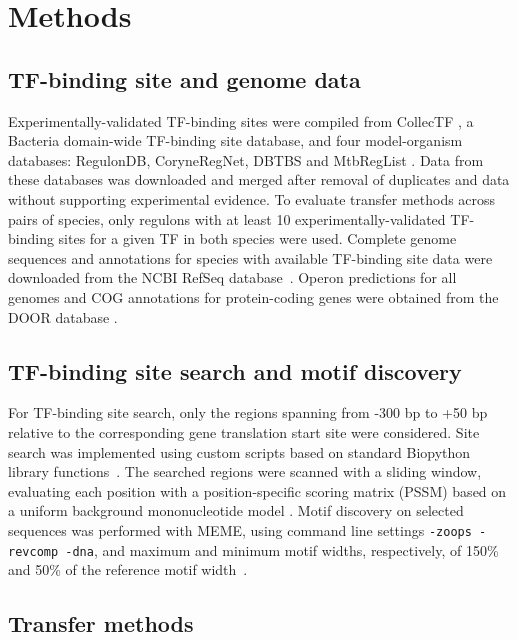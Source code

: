 \section{Methods}

\subsection{TF-binding site and genome data}

Experimentally-validated TF-binding sites were compiled from CollecTF
\citep{kilic2013collectf}, a Bacteria domain-wide TF-binding site database, and
four model-organism databases: RegulonDB, CoryneRegNet, DBTBS and MtbRegList
\citep{jacques2005mtbreglist, sierro2008dbtbs, pauling2012coryneregnet,
  salgado2013regulondb}. Data from these databases was downloaded and merged
after removal of duplicates and data without supporting experimental
evidence. To evaluate transfer methods across pairs of species, only regulons
with at least 10 experimentally-validated TF-binding sites for a given TF in
both species were used. Complete genome sequences and annotations for species
with available TF-binding site data were downloaded from the NCBI RefSeq
database~\citep{pruitt2007ncbi}. Operon predictions for all genomes and COG
annotations for protein-coding genes were obtained from the DOOR database
\citep{tatusov2000cog, mao2009door}.

\subsection{TF-binding site search and motif discovery}

For TF-binding site search, only the regions spanning from -300 bp to +50 bp
relative to the corresponding gene translation start site were considered. Site
search was implemented using custom scripts based on standard Biopython library
functions~\citep{cock2009biopython}. The searched regions were scanned with a
sliding window, evaluating each position with a position-specific scoring
matrix (PSSM) based on a uniform background mononucleotide model
\citep{stormo2000dna}. Motif discovery on selected sequences was performed with
MEME, using command line settings \texttt{-zoops -revcomp -dna}, and maximum
and minimum motif widths, respectively, of 150\% and 50\% of the reference
motif width~\citep{bailey2015meme}.

\subsection{Transfer methods}

